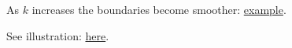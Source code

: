 As $k$ increases the boundaries become smoother:
\href{https://images.squarespace-cdn.com/content/v1/5d782753c70af105c29a9b14/1580261947016-XODPUVKWPGGMJJMAXSNF/Screen+Shot+2020-01-28+at+8.38.55+PM.png}{example}.

See illustration: \href{https://scikit-learn.org/stable/auto_examples/classification/plot_classifier_comparison.html}{here}.

